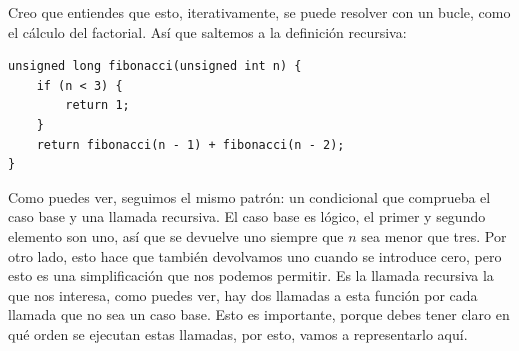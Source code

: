 \documentclass[a4paper]{article}
\begin{document}
Creo que entiendes que esto, iterativamente, se puede resolver con un bucle,
como el cálculo del factorial. Así que saltemos a la definición recursiva:


\noindent
\begin{minipage}[H]{\linewidth}
\mbox{}
\begin{lstlisting}[style=C, caption={Función para el cálculo de la suceción
de Fibonacci},
label={lst:funFibonacci}]
unsigned long fibonacci(unsigned int n) {
    if (n < 3) {
        return 1;
    }
    return fibonacci(n - 1) + fibonacci(n - 2);
}
\end{lstlisting}
\end{minipage}

Como puedes ver, seguimos el mismo patrón: un condicional que comprueba el caso
base y una llamada recursiva. El caso base es lógico, el primer y segundo
elemento son uno, así que se devuelve uno siempre que $n$ sea menor que tres.
Por otro lado, esto hace que también devolvamos uno cuando se introduce cero,
pero esto es una simplificación que nos podemos permitir. Es la llamada
recursiva la que nos interesa, como puedes ver, hay dos llamadas a esta función
por cada llamada que no sea un caso base. Esto es importante, porque debes tener
claro en qué orden se ejecutan estas llamadas, por esto, vamos a representarlo
aquí.
\end{document}
